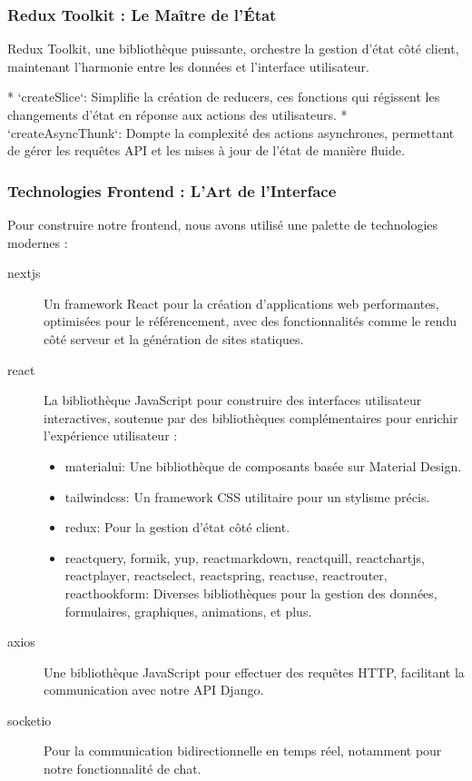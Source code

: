 \subsubsection{Redux Toolkit :  Le Maître de l'État}

Redux Toolkit, une bibliothèque puissante, orchestre la gestion d'état côté client, maintenant l'harmonie entre les données et l'interface utilisateur.

* `createSlice`:  Simplifie la création de reducers, ces fonctions qui régissent les changements d'état en réponse aux actions des utilisateurs.
* `createAsyncThunk`:  Dompte la complexité des actions asynchrones, permettant de gérer les requêtes API et les mises à jour de l'état de manière fluide.

\subsubsection{Technologies Frontend : L'Art de l'Interface}

Pour construire notre frontend, nous avons utilisé une palette de technologies modernes :

\begin{description}
    \item[\gls{nextjs}] Un framework React pour la création d'applications web performantes, optimisées pour le référencement, avec des fonctionnalités comme le rendu côté serveur et la génération de sites statiques.
    \item[\gls{react}] La bibliothèque JavaScript pour construire des interfaces utilisateur interactives, soutenue par des bibliothèques complémentaires pour enrichir l'expérience utilisateur :
    \begin{itemize}
        \item \gls{materialui}: Une bibliothèque de composants basée sur Material Design.
        \item \gls{tailwindcss}: Un framework CSS utilitaire pour un stylisme précis.
        \item \gls{redux}: Pour la gestion d'état côté client.
        \item \gls{reactquery}, \gls{formik}, \gls{yup}, \gls{reactmarkdown}, \gls{reactquill}, \gls{reactchartjs}, \gls{reactplayer}, \gls{reactselect}, \gls{reactspring}, \gls{reactuse}, \gls{reactrouter}, \gls{reacthookform}: Diverses bibliothèques pour la gestion des données, formulaires, graphiques, animations, et plus.
        \end{itemize}
    \item[\gls{axios}] Une bibliothèque JavaScript pour effectuer des requêtes HTTP, facilitant la communication avec notre API Django.
    \item[\gls{socketio}] Pour la communication bidirectionnelle en temps réel, notamment pour notre fonctionnalité de chat.
\end{description}

